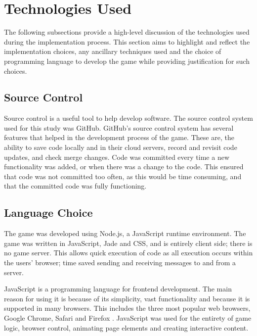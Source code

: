 \documentclass[a4paper,11.5pt]{report}
\numberwithin{figure}{section}
\numberwithin{table}{section}
\numberwithin{equation}{section}
\numberwithin{equation}{section}
\begin{document}


\section{Technologies Used}

The following subsections provide a high-level discussion of the technologies used during the implementation process. This section aims to highlight and reflect the implementation choices, any ancillary techniques used and the choice of programming language to develop the game while providing justification for such choices.

\subsection{Source Control}

Source control is a useful tool to help develop software. The source control system used for this study was GitHub. GitHub's source control system has several features that helped in the development process of the game. These are, the ability to save code locally and in their cloud servers, record and revisit code updates, and check merge changes. Code was committed every time a new functionality was added, or when there was a change to the code. This ensured that code was not committed too often, as this would be time consuming, and that the committed code was fully functioning.

\subsection{Language Choice}

The game was developed using Node.js, a JavaScript runtime environment. The game was written in JavaScript, Jade and CSS, and is entirely client side; there is no game server. This allows quick execution of code as all execution occurs within the users' browser; time saved sending and receiving messages to and from a server.

JavaScript is a programming language for frontend development. The main reason for using it is because of its simplicity, vast functionality and because it is supported in many browsers. This includes the three most popular web browsers, Google Chrome, Safari and Firefox \citep{statistabrowser}. JavaScript was used for the entirety of game logic, browser control, animating page elements and creating interactive content.
\end{document}
